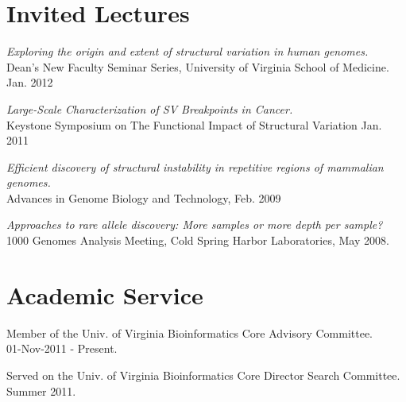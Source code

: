 \documentclass[margin,line]{cv}
\begin{document}
\begin{resume}
    \section{\mysidestyle Invited Lectures}
    
    \textit{Exploring the origin and extent of structural variation in human genomes.} \\
    Dean’s New Faculty Seminar Series, University of Virginia School of Medicine. Jan. 2012
    
    \vspace{-2mm}
    \textit{Large-Scale Characterization of SV Breakpoints in Cancer.} \\
    Keystone Symposium on The Functional Impact of Structural Variation Jan. 2011

    \vspace{-2mm}
    \textit{Efficient discovery of structural instability in repetitive regions of mammalian genomes.} \\
    Advances in Genome Biology and Technology, Feb. 2009

    \vspace{-2mm}
    \textit{Approaches to rare allele discovery: More samples or more depth per sample? } \\
    1000 Genomes Analysis Meeting, Cold Spring Harbor Laboratories, May 2008.
    
    \section{\mysidestyle Academic Service}
    
    Member of the Univ. of Virginia Bioinformatics Core Advisory Committee.\\
    01-Nov-2011 - Present.
    
    \vspace{-2mm}
    Served on the Univ. of Virginia Bioinformatics Core Director Search Committee. \\
    Summer 2011.




\end{resume}
\end{document}
